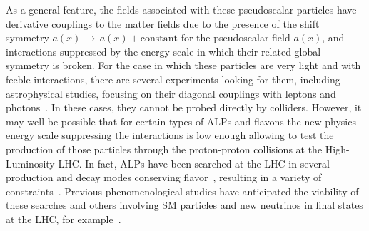 \documentclass[prd,amsfonts,onecolumn,superscriptaddress,aps,nofootinbib,11pt]{revtex4-1}
\begin{document}
As a general feature, the fields associated with these pseudoscalar  particles  have derivative couplings to the matter fields due to the presence of the shift symmetry $a(x)\,\rightarrow\,a(x)+\mathrm{constant}$ for the pseudoscalar field $a(x)$, and interactions suppressed by the energy scale in which their related global symmetry is broken. For the case in which these particles are very light and with feeble interactions, there are several experiments looking for them, including  astrophysical studies,  focusing on their diagonal couplings with leptons and photons~\cite{Workman:2022ynf,DiLuzio:2020wdo}. In these cases, they cannot be probed directly by colliders. However, it may well be possible that for certain types of ALPs and flavons the new physics energy scale suppressing the interactions is low enough allowing to test the production of those particles through the proton-proton collisions at the High-Luminosity LHC. In fact, ALPs have been searched at the LHC in several production and decay modes conserving flavor~\cite{dEnterria:2013zqi, CidVidal:2018blh, Goncalves:2021pdc,CMS:2018nsh, CMS:2019spf, ATLAS:2020ahi, CMS:2020ffa, ATLAS:2021hbr,ATLAS:2020pcy,dEnterria:2013zqi, CidVidal:2018blh, Goncalves:2021pdc,CMS:2018nsh, ATLAS:2020ahi, CMS:2020ffa, ATLAS:2021hbr,CMS:2020ffa,CMS:2018nsh, CMS:2019spf, ATLAS:2021hbr}, resulting in a variety of constraints~\cite{dEnterria:2021ljz}. Previous phenomenological studies have anticipated the viability of these searches and others involving SM particles and new neutrinos in final states at the LHC, for example~\cite{Mimasu:2014nea,Brivio:2017ije,Bauer:2018uxu,Bauer:2017ris,Bauer:2017nlg,Jaeckel:2015jla,Alves:2016koo,Alves:2019xpc,Gavela:2019cmq,Merlo:2019anv,Baldenegro:2019whq,Dobrich:2015jyk,Harland-Lang:2019zur,Dobrich:2019dxc,Hahn:1404985,Alekhin:2015byh,Feng:2018pew,Aloni:2019ruo,Alves:2021puo,Knapen:2021elo,Alonso-Alvarez:2023wni,Cheung:2023nzg}. 
\end{document}
